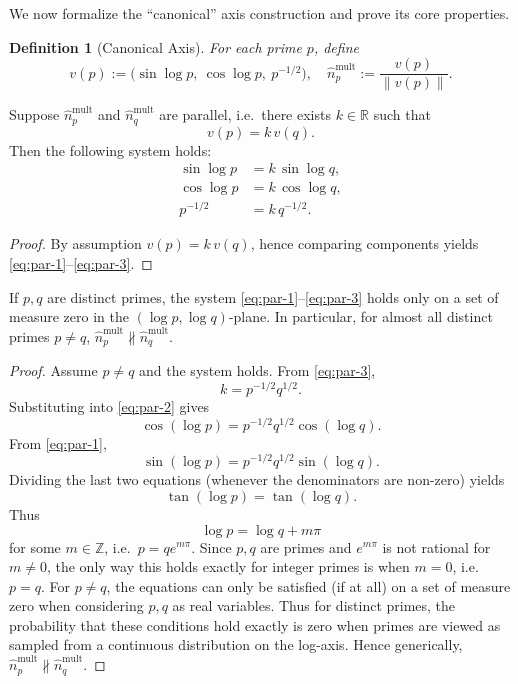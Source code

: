 \documentclass[11pt]{article}
\newtheorem{definition}[theorem]{Definition}
\theoremstyle{remark}
\begin{document}
We now formalize the ``canonical'' axis construction and prove its core
properties.

\begin{definition}[Canonical Axis]
For each prime $p$, define
\[
  v(p) := 
  \bigl(\sin\log p,\ \cos\log p,\ p^{-1/2}\bigr),\quad
  \hat{n}_p^{\mathrm{mult}} :=
  \frac{v(p)}{\|v(p)\|}.
\]
\end{definition}

\begin{lemma}
Suppose $\hat{n}_p^{\mathrm{mult}}$ and
$\hat{n}_q^{\mathrm{mult}}$ are parallel, i.e.\ there exists $k\in\mathbb{R}$
such that
\[
  v(p) = k\,v(q).
\]
Then the following system holds:
\begin{align}
  \sin\log p &= k\,\sin\log q, \label{eq:par-1}\\
  \cos\log p &= k\,\cos\log q, \label{eq:par-2}\\
  p^{-1/2}   &= k\,q^{-1/2}.   \label{eq:par-3}
\end{align}
\end{lemma}

\begin{proof}
By assumption $v(p)=k\,v(q)$, hence comparing components yields
\eqref{eq:par-1}–\eqref{eq:par-3}.
\end{proof}

\begin{proposition}
\label{prop:incompatibility-primes}
If $p,q$ are distinct primes, the system
\eqref{eq:par-1}–\eqref{eq:par-3} holds only on a set of measure zero in the
$(\log p,\log q)$-plane. In particular, for almost all distinct primes
$p\ne q$, $\hat{n}_p^{\mathrm{mult}} \not\parallel \hat{n}_q^{\mathrm{mult}}$.
\end{proposition}

\begin{proof}
Assume $p\neq q$ and the system holds. From \eqref{eq:par-3},
\[
  k = p^{-1/2} q^{1/2}.
\]
Substituting into \eqref{eq:par-2} gives
\[
  \cos(\log p) = p^{-1/2} q^{1/2} \cos(\log q).
\]
From \eqref{eq:par-1},
\[
  \sin(\log p) = p^{-1/2} q^{1/2} \sin(\log q).
\]
Dividing the last two equations (whenever the denominators are non-zero) yields
\[
  \tan(\log p) = \tan(\log q).
\]
Thus
\[
  \log p = \log q + m\pi
\]
for some $m\in\mathbb{Z}$, i.e.\ $p = q e^{m\pi}$. Since $p,q$ are primes
and $e^{m\pi}$ is not rational for $m\neq0$, the only way this holds exactly
for integer primes is when $m=0$, i.e.\ $p=q$. For $p\ne q$, the equations can
only be satisfied (if at all) on a set of measure zero when considering $p,q$
as real variables. Thus for distinct primes, the probability that these
conditions hold exactly is zero when primes are viewed as sampled from a
continuous distribution on the log-axis. Hence generically,
$\hat{n}_p^{\mathrm{mult}} \not\parallel \hat{n}_q^{\mathrm{mult}}$.
\end{proof}
\end{document}

